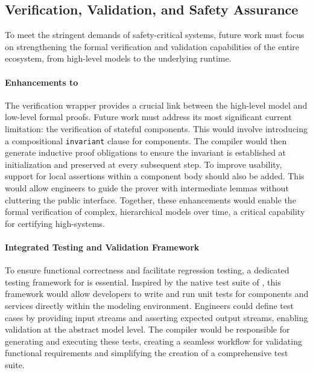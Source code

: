 \subsection{Verification, Validation, and Safety Assurance}

To meet the stringent demands of safety-critical systems, future work must focus on strengthening
the formal verification and validation capabilities of the entire \GRust ecosystem, from high-level
models to the underlying runtime.

\paragraph{Enhancements to \GReusot}
The \GReusot verification wrapper provides a crucial link between the high-level \GRust model and
low-level formal proofs. Future work must address its most significant current limitation: the
verification of stateful components. This would involve introducing a compositional
\texttt{invariant} clause for components. The compiler would then generate inductive proof
obligations to ensure the invariant is established at initialization and preserved at every
subsequent step. To improve usability, support for local assertions within a component body should
also be added. This would allow engineers to guide the prover with intermediate lemmas without
cluttering the public interface. Together, these enhancements would enable the formal verification
of complex, hierarchical models over time, a critical capability for certifying high-\Asil systems.

\paragraph{Integrated Testing and Validation Framework}
To ensure functional correctness and facilitate regression testing, a dedicated testing framework
for \GRust is essential. Inspired by the native test suite of \Rust, this framework would allow
developers to write and run unit tests for components and services directly within the modeling
environment. Engineers could define test cases by providing input streams and asserting expected
output streams, enabling validation at the abstract model level. The compiler would be responsible
for generating and executing these tests, creating a seamless workflow for validating functional
requirements and simplifying the creation of a comprehensive test suite.

